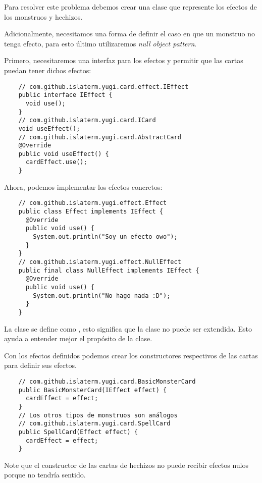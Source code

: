 \begin{Answer}[ref={ex:null-1}]
  Para resolver este problema debemos crear una clase que represente los efectos de los
  monstruos y hechizos.
  
  Adicionalmente, necesitamos una forma de definir el caso en que un monstruo no tenga 
  efecto, para esto último utilizaremos \textit{null object pattern}.
  
  Primero, necesitaremos una interfaz para los efectos y permitir que las cartas puedan
  tener dichos efectos:
  \begin{verbatim}
    // com.github.islaterm.yugi.card.effect.IEffect
    public interface IEffect {
      void use();
    }
    // com.github.islaterm.yugi.card.ICard
    void useEffect();
    // com.github.islaterm.yugi.card.AbstractCard
    @Override
    public void useEffect() {
      cardEffect.use();
    }      
  \end{verbatim}

  Ahora, podemos implementar los efectos concretos:
  \begin{verbatim}
    // com.github.islaterm.yugi.effect.Effect
    public class Effect implements IEffect {
      @Override
      public void use() {
        System.out.println("Soy un efecto owo");
      }
    }
    // com.github.islaterm.yugi.effect.NullEffect  
    public final class NullEffect implements IEffect {
      @Override
      public void use() {
        System.out.println("No hago nada :D");
      }
    }
  \end{verbatim}
  La clase  se define como , esto significa que la clase no
  puede ser extendida.
  Esto ayuda a entender mejor el propósito de la clase.
  
  Con los efectos definidos podemos crear los constructores respectivos de las cartas 
  para definir sus efectos.
  \begin{verbatim}
    // com.github.islaterm.yugi.card.BasicMonsterCard
    public BasicMonsterCard(IEffect effect) {
      cardEffect = effect;
    }
    // Los otros tipos de monstruos son análogos
    // com.github.islaterm.yugi.card.SpellCard
    public SpellCard(Effect effect) {
      cardEffect = effect;
    }
  \end{verbatim}

  Note que el constructor de las cartas de hechizos no puede recibir efectos nulos 
  porque no tendría sentido.
\end{Answer}